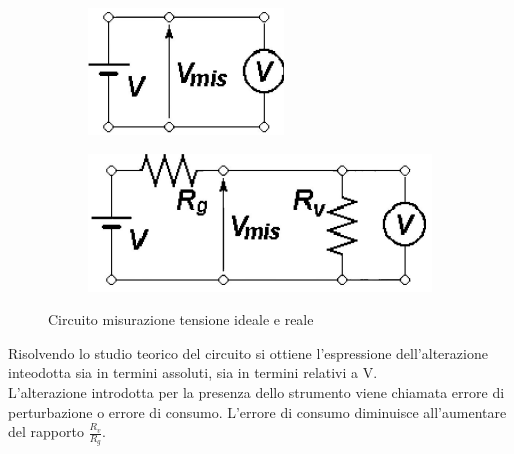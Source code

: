 \documentclass{article}
\begin{document}
\begin{figure}
     \begin{subfigure}[]{}
         \centering
         \includegraphics[scale=0.66]{Circuito Misurazione Tensione 1.png}
         \label{fig:CircuitoMisurazioneTensione}
     \end{subfigure}
     \hfill
      \begin{subfigure}[]{}
         \centering
         \includegraphics[scale=0.63]{Circuito Misurazione Tensione 2.png}
         \label{fig:CircuitoMisurazioneTensionee}
     \end{subfigure}
     \caption{Circuito misurazione tensione ideale e reale}
     \label{fig:Circuito Misurazione Tensione}
\end{figure}
Risolvendo lo studio teorico del circuito si ottiene l’espressione dell’alterazione inteodotta sia in termini assoluti, sia in termini relativi a V. \\
L’alterazione introdotta per la presenza dello strumento viene chiamata errore di perturbazione o errore di consumo. L'errore di consumo diminuisce all'aumentare del rapporto $\frac{R_{v}}{R_{g}}$.\\
\end{document}
